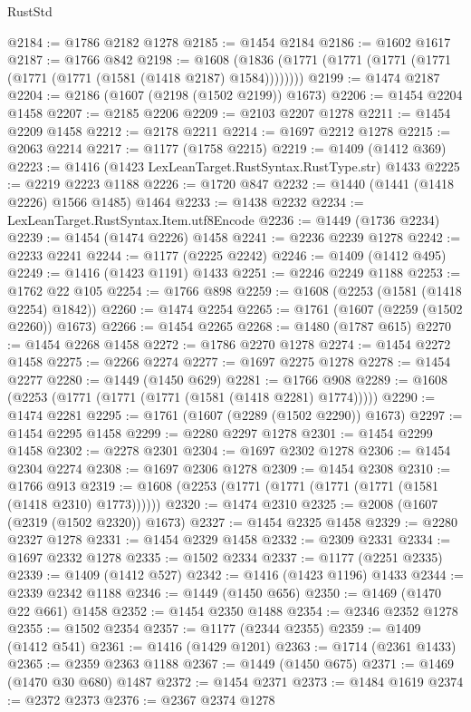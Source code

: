 \begin{lexlean}{RustStd}
\begin{coremodule}
{\begin{coremodule}
{{{{{{{{{{{{{{{{{{{{{{{{{{{{{{{@2184 := @1786 @2182 @1278
@2185 := @1454 @2184
@2186 := @1602 @1617
@2187 := @1766 @842
@2198 := @1608 (@1836 (@1771 (@1771 (@1771 (@1771 (@1771 (@1771 (@1581 (@1418 @2187) @1584))))))))
@2199 := @1474 @2187
@2204 := @2186 (@1607 (@2198 (@1502 @2199)) @1673)
@2206 := @1454 @2204 @1458
@2207 := @2185 @2206
@2209 := @2103 @2207 @1278
@2211 := @1454 @2209 @1458
@2212 := @2178 @2211
@2214 := @1697 @2212 @1278
@2215 := @2063 @2214
@2217 := @1177 (@1758 @2215)
@2219 := @1409 (@1412 @369)
@2223 := @1416 (@1423 LexLeanTarget.RustSyntax.RustType.str) @1433
@2225 := @2219 @2223 @1188
@2226 := @1720 @847
@2232 := @1440 (@1441 (@1418 @2226) @1566 @1485) @1464
@2233 := @1438 @2232
@2234 := LexLeanTarget.RustSyntax.Item.utf8Encode
@2236 := @1449 (@1736 @2234)
@2239 := @1454 (@1474 @2226) @1458
@2241 := @2236 @2239 @1278
@2242 := @2233 @2241
@2244 := @1177 (@2225 @2242)
@2246 := @1409 (@1412 @495)
@2249 := @1416 (@1423 @1191) @1433
@2251 := @2246 @2249 @1188
@2253 := @1762 @22 @105
@2254 := @1766 @898
@2259 := @1608 (@2253 (@1581 (@1418 @2254) @1842))
@2260 := @1474 @2254
@2265 := @1761 (@1607 (@2259 (@1502 @2260)) @1673)
@2266 := @1454 @2265
@2268 := @1480 (@1787 @615)
@2270 := @1454 @2268 @1458
@2272 := @1786 @2270 @1278
@2274 := @1454 @2272 @1458
@2275 := @2266 @2274
@2277 := @1697 @2275 @1278
@2278 := @1454 @2277
@2280 := @1449 (@1450 @629)
@2281 := @1766 @908
@2289 := @1608 (@2253 (@1771 (@1771 (@1771 (@1581 (@1418 @2281) @1774)))))
@2290 := @1474 @2281
@2295 := @1761 (@1607 (@2289 (@1502 @2290)) @1673)
@2297 := @1454 @2295 @1458
@2299 := @2280 @2297 @1278
@2301 := @1454 @2299 @1458
@2302 := @2278 @2301
@2304 := @1697 @2302 @1278
@2306 := @1454 @2304 @2274
@2308 := @1697 @2306 @1278
@2309 := @1454 @2308
@2310 := @1766 @913
@2319 := @1608 (@2253 (@1771 (@1771 (@1771 (@1771 (@1581 (@1418 @2310) @1773))))))
@2320 := @1474 @2310
@2325 := @2008 (@1607 (@2319 (@1502 @2320)) @1673)
@2327 := @1454 @2325 @1458
@2329 := @2280 @2327 @1278
@2331 := @1454 @2329 @1458
@2332 := @2309 @2331
@2334 := @1697 @2332 @1278
@2335 := @1502 @2334
@2337 := @1177 (@2251 @2335)
@2339 := @1409 (@1412 @527)
@2342 := @1416 (@1423 @1196) @1433
@2344 := @2339 @2342 @1188
@2346 := @1449 (@1450 @656)
@2350 := @1469 (@1470 @22 @661) @1458
@2352 := @1454 @2350 @1488
@2354 := @2346 @2352 @1278
@2355 := @1502 @2354
@2357 := @1177 (@2344 @2355)
@2359 := @1409 (@1412 @541)
@2361 := @1416 (@1429 @1201)
@2363 := @1714 (@2361 @1433)
@2365 := @2359 @2363 @1188
@2367 := @1449 (@1450 @675)
@2371 := @1469 (@1470 @30 @680) @1487
@2372 := @1454 @2371
@2373 := @1484 @1619
@2374 := @2372 @2373
@2376 := @2367 @2374 @1278
}}}}}}}}}}}}}}}}}}}}}}}}}}}}}}}
\end{coremodule}}
\end{coremodule}
\end{lexlean}
